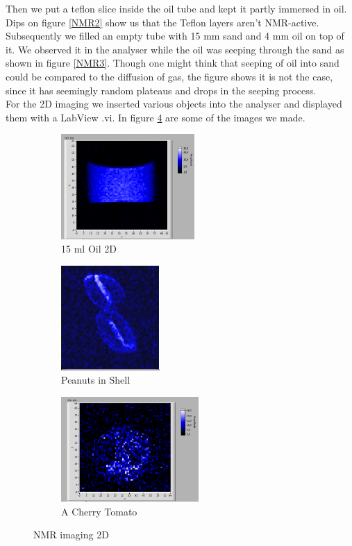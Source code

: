 Then we put a teflon slice inside the oil tube and kept it partly immersed in oil. Dips on figure \ref{NMR2} show us that the Teflon layers aren't NMR-active.\\
Subsequently we filled an empty tube with 15 mm sand and 4 mm oil on top of it. We observed it in the analyser while the oil was seeping through the sand as shown in figure \ref{NMR3}. Though one might think that seeping of oil into sand could be compared to the diffusion of gas, the figure shows it is not the case, since it has seemingly random plateaus and drops in the seeping process. \\
For the 2D imaging we inserted various objects into the analyser and displayed them with a LabView .vi. In figure \ref{2DNMR} are some of the images we made. \\
\begin{figure}[h]
	\begin{subfigure}{0.32\textwidth}
	\includegraphics[width=0.9\linewidth ,height=4cm]{2d_image/Oil_Vertical_15_2.png}
	\caption{15 ml Oil 2D}
	\label{2DNMR1}
	\end{subfigure}
	\begin{subfigure}{0.32\textwidth}
	\includegraphics[width=0.9\linewidth ,height=4cm]{2d_image/peanut_5avg_2_3d.png}
	\caption{Peanuts in Shell}
	\label{2DNMR2}
	\end{subfigure}
	\begin{subfigure}{0.32\textwidth}
	\includegraphics[width=0.9\linewidth, height=4cm]{2d_image/tomato_2.png}
	\caption{A Cherry Tomato}
	\label{2DNMR3}
	\end{subfigure}
	\caption{NMR imaging 2D}
	\label{2DNMR}
\end{figure} \\
